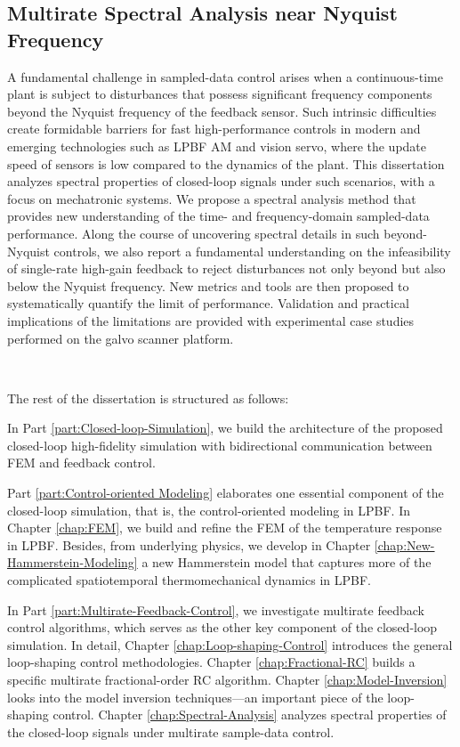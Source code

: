 \documentclass [11pt, proquest] {uwthesis}[2020/02/24]
\begin{document}
\subsection*{Multirate Spectral Analysis near Nyquist Frequency}
A fundamental challenge in sampled-data control arises when a continuous-time plant is subject to disturbances that possess significant frequency components beyond the Nyquist frequency of the feedback sensor. Such intrinsic difficulties create formidable barriers for fast high-performance controls in modern and emerging technologies such as LPBF AM and vision servo, where the update speed of sensors is low compared to the dynamics of the plant. This dissertation analyzes spectral properties of closed-loop signals under such scenarios, with a focus on mechatronic systems. We propose a spectral analysis method that provides new understanding of the time- and frequency-domain sampled-data performance. Along the course of uncovering spectral details in such beyond-Nyquist controls, we also report a fundamental understanding on the infeasibility of single-rate high-gain feedback to reject disturbances not only beyond but also below the Nyquist frequency. New metrics and tools are then proposed to systematically quantify the limit of performance. Validation and practical implications of the limitations are provided with experimental case studies performed on the galvo scanner platform.

\

\noindent The rest of the dissertation is structured as follows:

In Part \ref{part:Closed-loop-Simulation}, we build the architecture of the proposed closed-loop high-fidelity simulation with bidirectional communication between FEM and feedback control.

Part \ref{part:Control-oriented Modeling} elaborates one essential component of the closed-loop simulation, that is, the control-oriented modeling in LPBF. In Chapter \ref{chap:FEM}, we build and refine the FEM of the temperature response in LPBF. Besides, from underlying physics, we develop in Chapter \ref{chap:New-Hammerstein-Modeling} a new Hammerstein model that captures more of the complicated spatiotemporal thermomechanical dynamics in LPBF.

In Part \ref{part:Multirate-Feedback-Control}, we investigate multirate feedback control algorithms, which serves as the other key component of the closed-loop simulation. In detail, Chapter \ref{chap:Loop-shaping-Control} introduces the general loop-shaping control methodologies. Chapter \ref{chap:Fractional-RC} builds a specific multirate fractional-order RC algorithm. Chapter \ref{chap:Model-Inversion} looks into the model inversion techniques---an important piece of the loop-shaping control. Chapter \ref{chap:Spectral-Analysis} analyzes spectral properties of the closed-loop signals under multirate sample-data control.
\end{document}
